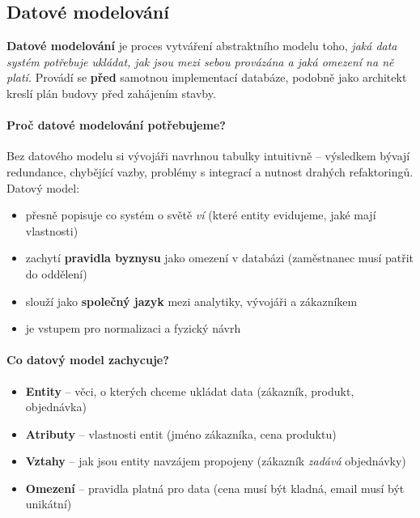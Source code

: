\subsection{Datové modelování}

\textbf{Datové modelování} je proces vytváření abstraktního modelu toho, \textit{jaká data systém
potřebuje ukládat, jak jsou mezi sebou provázána a jaká omezení na ně platí.}
Provádí se \textbf{před} samotnou implementací databáze, podobně jako architekt kreslí plán budovy
před zahájením stavby.

\paragraph{Proč datové modelování potřebujeme?}
Bez datového modelu si vývojáři navrhnou tabulky intuitivně -- výsledkem bývají redundance,
chybějící vazby, problémy s integrací a nutnost drahých refaktoringů. Datový model:
\begin{itemize}
  \item přesně popisuje co systém o světě \textit{ví} (které entity evidujeme, jaké mají vlastnosti)
  \item zachytí \textbf{pravidla byznysu} jako omezení v databázi (zaměstnanec musí patřit do oddělení)
  \item slouží jako \textbf{společný jazyk} mezi analytiky, vývojáři a zákazníkem
  \item je vstupem pro normalizaci a fyzický návrh
\end{itemize}

\paragraph{Co datový model zachycuje?}
\begin{itemize}
  \item \textbf{Entity} -- věci, o kterých chceme ukládat data (zákazník, produkt, objednávka)
  \item \textbf{Atributy} -- vlastnosti entit (jméno zákazníka, cena produktu)
  \item \textbf{Vztahy} -- jak jsou entity navzájem propojeny (zákazník \textit{zadává} objednávky)
  \item \textbf{Omezení} -- pravidla platná pro data (cena musí být kladná, email musí být unikátní)
\end{itemize}

